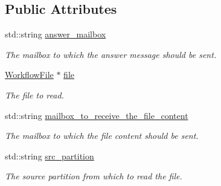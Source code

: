 \subsection*{Public Attributes}
\begin{DoxyCompactItemize}
\item 
\mbox{\label{classwrench_1_1_storage_service_file_read_request_message_ae3b18f7ca721898c731a9cff09a67f3e}} 
std\+::string \hyperlink{classwrench_1_1_storage_service_file_read_request_message_ae3b18f7ca721898c731a9cff09a67f3e}{answer\+\_\+mailbox}
\begin{DoxyCompactList}\small\item\em The mailbox to which the answer message should be sent. \end{DoxyCompactList}\item 
\mbox{\label{classwrench_1_1_storage_service_file_read_request_message_a4a54efd6596532b21d135f59bfad7eb8}} 
\hyperlink{classwrench_1_1_workflow_file}{Workflow\+File} $\ast$ \hyperlink{classwrench_1_1_storage_service_file_read_request_message_a4a54efd6596532b21d135f59bfad7eb8}{file}
\begin{DoxyCompactList}\small\item\em The file to read. \end{DoxyCompactList}\item 
\mbox{\label{classwrench_1_1_storage_service_file_read_request_message_a3cc7323e6c5d74ec2408d60cbb9d8de4}} 
std\+::string \hyperlink{classwrench_1_1_storage_service_file_read_request_message_a3cc7323e6c5d74ec2408d60cbb9d8de4}{mailbox\+\_\+to\+\_\+receive\+\_\+the\+\_\+file\+\_\+content}
\begin{DoxyCompactList}\small\item\em The mailbox to which the file content should be sent. \end{DoxyCompactList}\item 
\mbox{\label{classwrench_1_1_storage_service_file_read_request_message_a22bfdc4532b66469b60c77aa7ec65459}} 
std\+::string \hyperlink{classwrench_1_1_storage_service_file_read_request_message_a22bfdc4532b66469b60c77aa7ec65459}{src\+\_\+partition}
\begin{DoxyCompactList}\small\item\em The source partition from which to read the file. \end{DoxyCompactList}\end{DoxyCompactItemize}

